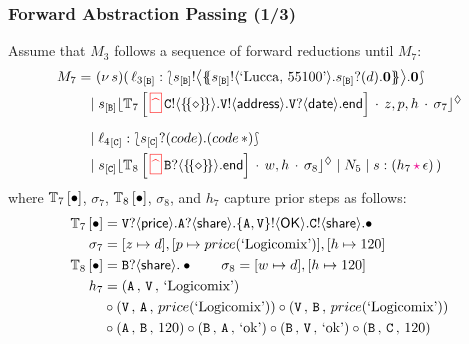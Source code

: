 \documentclass[12pt]{beamer}
\newcommand{\myctxr}[2]{{#1\left[\textcolor{black}{#2}\right]}}
\newcommand{\pS}{\ensuremath{\mathtt{V}}\xspace}
\newcommand{\thunkt}{\ensuremath\{\!\{\diamond\}\!\}}
\newcommand{\blrangle}[1]{\big\langle #1 \big\rangle}
\newcommand{\sepcolor}[1]{\textcolor{magenta}{#1}}
\newcommand{\upd}[2]{[#1\mapsto #2]}
\newcommand{\sred}[1]{\textcolor{myred}{#1}}
\newcommand{\news}[1]{(\nu\, #1)}
\newcommand{\queue}[1]{\lfloor #1 \rfloor}
\newcommand{\store}{\sigma}
\newcommand{\ctx}[1]{\mathbb{#1}}
\newcommand{\mysepp}{\,\cdot\,}
\newcommand{\codah}[4]{\coda{#1}{(#2\,\history\,#3)\!#4}}
\newcommand{\history}{\sepcolor{\mathbf{\star}}}
\newcommand{\coda}[2]{#1:#2}
\newcommand{\lend}{\mathsf{end}}
\newcommand{\gpart}[1]{\mathtt{#1}}
\newcommand{\hmoni}[4]{\ensuremath{{#1\queue{\textcolor{black}{#2}\mysepp #3\mysepp #4}^{\normark}}}}
\newcommand{\past}{\,\text{\textcolor{red}{\textbf{\textasciicircum}}}\,}
\newcommand{\mypast}{\,\sred{\framebox[3mm]{\past}\,}}
\newcommand{\conf}[2]{\lbag #2 \rbag} %
\newcommand{\ltout}[3]{\gpart{#1}!\langle#2\rangle.#3}
\newcommand{\ltinp}[3]{\gpart{#1}?\langle#2\rangle.#3}
\newcommand{\outses}{!}
\newcommand{\inpses}{?}
\newcommand{\Par}{\;|\;}
\newcommand{\emp}{\epsilon}
\newcommand{\valueq}[3]{(#1 \,,\, #2 \,,\,#3)}
\newcommand{\freev}[1]{\langle #1\rangle}
\newcommand{\boundv}[1]{(#1)}
\newcommand{\shsep}{.}
\newcommand{\cons}{\circ}
\newcommand{\appl}[2]{#1\, {#2}}
\newcommand{\bout}[2]{#1 \outses \freev{#2} \shsep}
\newcommand{\bbout}[2]{#1 \outses \blrangle{#2} \shsep}
\newcommand{\binp}[2]{#1 \inpses \boundv{#2} \shsep}
\newcommand{\key}[2]{#1_{[#2]}}
\newcommand{\np}[2]{#1:#2}
\newcommand{\ep}[2]{#1_{[#2]}}
\newcommand{\loc}{\ell}
\newcommand{\normark}{\lozenge}
\newcommand{\inact}{\mathbf{0}}
\newcommand{\pA}{\ensuremath{\mathtt{A}}\xspace}
\newcommand{\epB}{\ep{s}{\mathtt{B}}}
\newcommand{\pB}{\ensuremath{\mathtt{B}}\xspace}
\newcommand{\epC}{\ep{s}{\mathtt{C}}}
\newcommand{\pC}{\ensuremath{\mathtt{C}}\xspace}
\newcommand{\exBook}{\text{`Logicomix'}}
\newcommand{\thunkp}[1]{\ensuremath\{\!\!\{#1\}\!\!\}}
\newcommand{\dummyn}{\ensuremath{\ast}}
\begin{document}
\begin{frame}
\frametitle{Forward Abstraction Passing (1/3)}
\vspace{-1.5mm}
Assume that $M_3$ follows a sequence of forward reductions
until $M_7$:
\begin{align*}
M_7 = ~ &   \news{s}(\,  \np{\key{{\loc_3}}{\pB}}{ \conf{\inact}{\bbout{\epB}{\thunkp{\bout{\epB}{\text{`Lucca, 55100'}}\binp{\epB}{d}\inact}}\inact}} 
\\
& \!\!\!\! \Par \hmoni{\ep{s}{\pB}}{\myctxr{\ctx{T}_7}{\mypast \ltout{C}{\thunkt}{\ltout{\pS}{\mathsf{address}}{\ltinp{\pS}{\mathsf{date}}{\lend}}}}}{z,p,h}{\store_7} 
\\[2mm]
& \!\!\!\! \Par \np{\key{{\loc_4}}{\pC}}{ \conf{\inact}{\binp{\epC}{code}(\appl{code}{\dummyn})}} 
\\
&  \!\!\!\! \Par 
\hmoni{\ep{s}{\pC}}{\myctxr{\ctx{T}_8}{\mypast \ltinp{B}{\thunkt}{\lend}}}{w,h}{\store_8} 
\Par N_5 \Par \codah{s}{h_7}{\emp}{}~) 
\end{align*}
\smallskip
\pause
where 
$\myctxr{\ctx{T}_7}{\bullet}$, $\store_7$, $\myctxr{\ctx{T}_8}{\bullet}$, $\store_8$,
and $h_7$ capture prior steps as follows:
\begin{align*}
\myctxr{\ctx{T}_7}{\bullet} & =
\ltinp{\pS}{\mathsf{price}}{\ltinp{A}{\mathsf{share}}{\ltout{\{A,\pS\}}{\mathsf{OK}}{
\ltout{C}{\mathsf{share}}{\bullet}}}}
\\
\store_7 & = \upd{z}{d},\upd{p}{price(\exBook)},\upd{h}{120}
\\
\myctxr{\ctx{T}_8}{\bullet} & =\ltinp{B}{\mathsf{share}}{\bullet} \qquad \store_8  = \upd{w}{d},\upd{h}{120}
\\
h_7 & = 
\valueq{\pA}{\pS}{\exBook}
\\
& \cons
\valueq{\pS}{\pA}{price(\exBook)}
\cons
\valueq{\pS}{\pB}{price(\exBook)}
\\
& \cons
\valueq{\pA}{\pB}{120}
\cons
\valueq{\pB}{\pA}{\text{`ok'}}
\cons
\valueq{\pB}{\pS}{\text{`ok'}}
\cons
\valueq{\pB}{\pC}{120}
\end{align*}
\end{frame}
\end{document}
